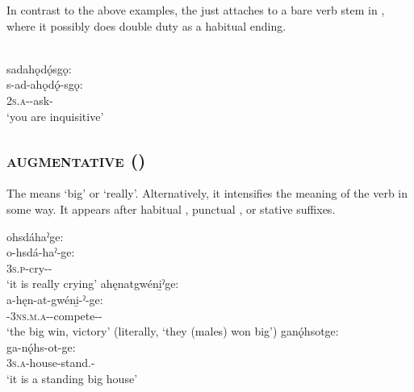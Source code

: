 In contrast to the above examples, the  {\facilitative} just attaches to a bare verb stem in , where it possibly does double duty as a habitual ending.

\ea\label{ex:facilex2} \\
sadahǫdǫ́sgǫ:\\
\gll s-ad-ahǫdǫ́-sgǫ:\\
 \textsc{2s.a}-{\semireflexive}-ask-{\habitualfacilitative}\\
\glt `you are inquisitive'
\z


\subsection{ \textsc{augmentative} ({\augmentative})} \label{[-ge:] (augmentative)}
The  \textsc{\augmentative} means ‘big’ or ‘really’. Alternatively, it intensifies the meaning of the verb in some way. It appears after habitual , punctual , or stative  suffixes.

\ea\label{ex:augmex} 
\ea ohsdáhaˀge:\\\label{ex:augmexa}
\gll o-hsdá-haˀ-ge:\\
 \textsc{3s.p}-cry-{\habitual}-{\augmentative}\\
\glt `it is really crying'
\ex ahęnatgwéni̱ˀge: \\\label{ex:augmexb}
\gll a-hęn-at-gwéni̱-ˀ-ge: \\
{\factual}-\textsc{3ns.m.a}-{\semireflexive}-compete-{\punctual}-{\augmentative}\\
\glt ‘the big win, victory’ (literally, ‘they (males) won big’) 
\ex ganǫ́hsotge:\\\label{ex:augmexc}
\gll ga-nǫ́hs-ot-ge:\\
 \textsc{3s.a}-house-stand.{\stative}-{\augmentative}\\
\glt `it is a standing big house'
\z
\z

